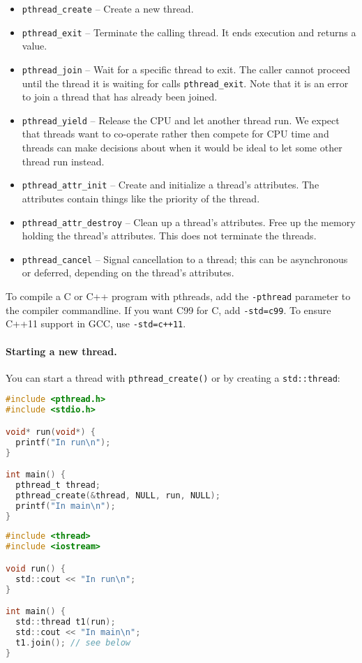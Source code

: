 \begin{itemize}
	\item \texttt{pthread\_create} -- Create a new thread. 
	\item \texttt{pthread\_exit} -- Terminate the calling thread. It ends execution and returns a value.
	\item \texttt{pthread\_join} -- Wait for a specific thread to exit. The caller cannot proceed until the thread it is waiting for calls \texttt{pthread\_exit}. Note that it is an error to join a thread that has already been joined.
	\item \texttt{pthread\_yield} -- Release the CPU and let another thread run. We expect that threads want to co-operate rather then compete for CPU time and threads can make decisions about when it would be ideal to let some other thread run instead.
	\item \texttt{pthread\_attr\_init} -- Create and initialize a thread's attributes. The attributes contain things like the priority of the thread.
	\item \texttt{pthread\_attr\_destroy} -- Clean up a thread's attributes. Free up the memory holding the thread's attributes. This does not terminate the threads.
	\item \texttt{pthread\_cancel} -- Signal cancellation to a thread; this can be asynchronous or deferred, depending on the thread's attributes.
\end{itemize}


To compile a C or C++ program
with pthreads, add the {\tt -pthread} parameter to the compiler
commandline. If you want C99 for C, add \texttt{-std=c99}. To ensure C++11 support in GCC, use \verb!-std=c++11!.

\paragraph{Starting a new thread.} You can start a thread with
\verb+pthread_create()+ or by creating a \verb+std::thread+:

{\small
  \begin{minipage}{.55\textwidth}
\begin{lstlisting}[language=C]
#include <pthread.h>
#include <stdio.h>

void* run(void*) {
  printf("In run\n");
}

int main() {
  pthread_t thread;
  pthread_create(&thread, NULL, run, NULL);
  printf("In main\n");
}
\end{lstlisting}
  \end{minipage} 
  \begin{minipage}{.4\textwidth}
\begin{lstlisting}[language=C]
#include <thread>
#include <iostream>

void run() {
  std::cout << "In run\n";
}

int main() {
  std::thread t1(run);
  std::cout << "In main\n";
  t1.join(); // see below
}
\end{lstlisting}
  \end{minipage}
}

